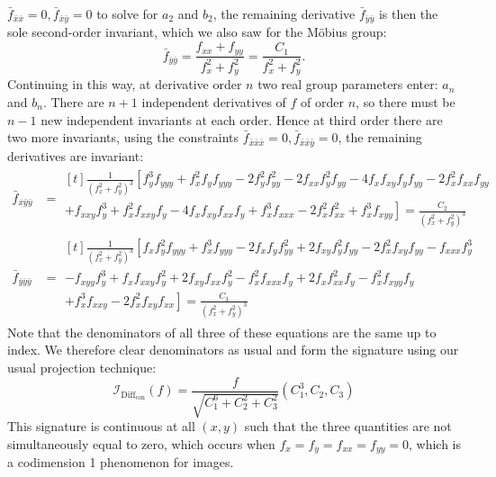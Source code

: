 \documentclass[review,onefignum,onetabnum]{siamonline190516}
\begin{document}
$\bar{f}_{\bar{x}\bar{x}} = 0, \bar{f}_{\bar{x}\bar{y}} = 0$ to solve for
$a_2$ and $b_2$, the remaining derivative $\bar{f}_{\bar{y}\bar{y}}$ is then the
sole second-order invariant, which we also saw for the M\"obius group: 
\begin{equation}
    \bar{f}_{\bar{y}\bar{y}} = \frac{f_{xx} + f_{yy}}{f_x^2 + f_y^2} =
    \frac{C_1}{f_x^2 + f_y^2}.
\label{eqn:C1}
\end{equation}
Continuing in this way, at derivative order $n$ two real group parameters
enter: $a_n$ and $b_n$. There are $n+1$ independent derivatives of $f$ of
order $n$, so there must be $n-1$ new independent invariants at each order.
Hence at third order there are two more invariants, using the constraints
$\bar{f}_{\bar{x}\bar{x}\bar{x}} = 0, \bar{f}_{\bar{x}\bar{x}\bar{y}} = 0$,
the remaining derivatives are invariant:
\begin{align}
    \bar{f}_{\bar{x}\bar{y}\bar{y}} &= 
    \begin{multlined}[t]
        \frac{1}{(f_x^2 + f_y^2)^3} \left[
f_y^3f_{yyy} + f_x^2f_yf_{yyy}
            -2f_y^2f_{yy}^2 - 2f_{xx}f_y^2f_{yy} -
            4f_xf_{xy}f_yf_{yy} - 2f_x^2 f_{xx}f_{yy} \right. \\ 
+ \left. f_{xxy}f_y^3 +
            f_x^2 f_{xxy}f_y - 4 f_x f_{xy} f_{xx} f_y + f_x^3 f_{xxx} -
    2f_x^2 f_{xx}^2 + f_x^3 f_{xyy} \right]
    = \frac{C_2}{(f_x^2 +
f_y^2)^3}\end{multlined} \\
    \bar{f}_{\bar{y}\bar{y}\bar{y}} &= 
    \begin{multlined}[t]
        \frac{1}{(f_x^2 + f_y^2)^3} \left[
f_xf_y^2f_{yyy} +
        f_x^3f_{yyy} - 2f_x f_y f_{yy}^2 + 2f_{xy}f_y^2f_{yy} -
    2f_x^2f_{xy}f_{yy} - f_{xxx}f_y^3 \right. \\ 
-  f_{xyy}f_y^3 + f_xf_{xxy}f_y^2 +
2f_{xy}f_{xx}f_y^2 - f_x^2 f_{xxx} f_y + 2f_xf_{xx}^2 f_y - f_x^2 f_{xyy}
f_y \\\left.+ f_x^3 f_{xxy} - 2f_x^2 f_{xy} f_{xx}\right]
= \frac{C_3}{(f_x^2 + f_y^2)^3}
\end{multlined}\label{eqn:C3}
\end{align}
Note that the denominators of all three of these equations are the same up
to index. We therefore clear denominators as usual and form the
signature using our usual projection technique:
\begin{equation}
    \label{eq:conformalsignature}
\mathcal{I}_{\text{Diff}_\text{con}}(f) = \frac{f}{\sqrt{C_1^6 + C_2^2 +
C_3^2}}(C_1^3, C_2, C_3)
\end{equation}
This signature is continuous at all $(x,y)$ such that the three quantities
are not simultaneously equal to zero, which occurs when $f_x = f_y = f_{xx}
= f_{yy} = 0$, which is a codimension 1 phenomenon for images.
\end{document}
